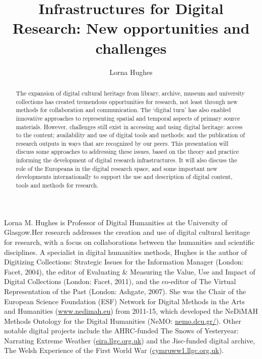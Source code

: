 \documentclass[amsthm,ebook]{saparticle}
\title{Infrastructures for Digital Research: New opportunities and challenges}
\author[]{Lorna Hughes\corref{first}}
\begin{document}
\maketitle
\begin{abstract}
The expansion of digital cultural heritage from library, archive, museum and university collections has created tremendous opportunities for research, not least through new methods for collaboration and communication. The ‘digital turn’ has also enabled innovative approaches to representing spatial and temporal aspects of primary source materials. However, challenges still exist in accessing and using digital heritage: access to the content; availability and use of digital tools and methods; and the publication of research outputs in ways that are recognized by our peers.
 This presentation will discuss some approaches to addressing these issues, based on the theory and practice informing the development of digital research infrastructures. It will also discuss the role of the Europeana in the digital research space, and some important new developments internationally to support the use and description of digital content, tools and methods for research. 
\end{abstract}

\vspace{1cm}
Lorna M. Hughes is Professor of Digital Humanities at the University of Glasgow.Her research addresses the creation and use of digital cultural heritage for research, with a focus on collaborations between the humanities and scientific disciplines. A specialist in digital humanities methods, Hughes is the author of Digitizing Collections: Strategic Issues for the Information Manager (London: Facet, 2004), the editor of Evaluating \& Measuring the Value, Use and Impact of Digital Collections (London: Facet, 2011), and the co-editor of The Virtual Representation of the Past (London: Ashgate, 2007). She was the Chair of the European Science Foundation (ESF) Network for Digital Methods in the Arts and Humanities (\url{www.nedimah.eu}) from 2011-15, which developed the NeDiMAH Methods Ontology for the Digital Humanities (NeMO: \url{nemo.dcu.gr/}). Other notable digital projects include the AHRC-funded The Snows of Yesteryear: Narrating Extreme Weather (\url{eira.llgc.org.uk}) and the Jisc-funded digital archive, The Welsh Experience of the First World War (\url{cymruww1.llgc.org.uk}).
\end{document}
